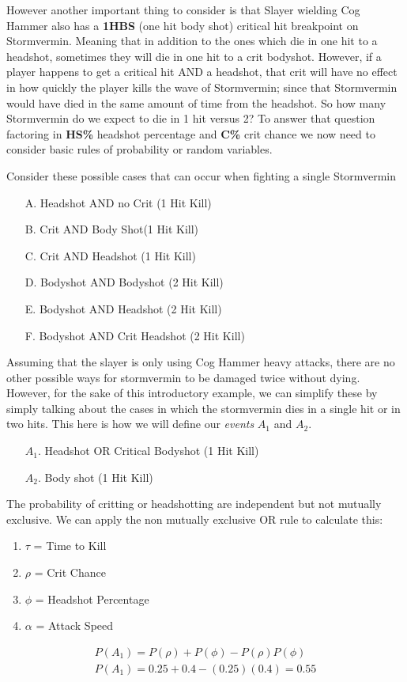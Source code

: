 \documentclass{article}
\begin{document}
However another important thing to consider is that Slayer wielding Cog Hammer also has a \textbf{1HBS} (one hit body shot) critical hit breakpoint on Stormvermin. Meaning that in addition to the ones which die in one hit to a headshot, sometimes they will die in one hit to a crit bodyshot. However, if a player happens to get a critical hit AND a headshot, that crit will have no effect in how quickly the player kills the wave of Stormvermin; since that Stormvermin would have died in the same amount of time from the headshot. So how many Stormvermin do we expect to die in 1 hit versus 2? To answer that question factoring in \textbf{HS\%} headshot percentage and \textbf{C\%} crit chance we now need to consider basic rules of probability or random variables.

Consider these possible cases that can occur when fighting a single Stormvermin
\begin{enumerate}
\item[A.] Headshot AND no Crit (1 Hit Kill)
\item[B.] Crit AND Body Shot(1 Hit Kill)
\item[C.] Crit AND Headshot (1 Hit Kill)
\item[D.] Bodyshot AND Bodyshot (2 Hit Kill)
\item[E.] Bodyshot AND Headshot (2 Hit Kill)
\item[F.] Bodyshot AND Crit Headshot (2 Hit Kill)
\end{enumerate}

Assuming that the slayer is only using Cog Hammer heavy attacks, there are no other possible ways for stormvermin to be damaged twice without dying. However, for the sake of this introductory example, we can simplify these by simply talking about the cases in which the stormvermin dies in a single hit or in two hits. This here is how we will define our \emph{events} $A_1$ and $A_2$.

\begin{enumerate}
\item[$A_1$.] Headshot OR Critical Bodyshot (1 Hit Kill)
\item[$A_2$.] Body shot (1 Hit Kill)
\end{enumerate}

The probability of critting or headshotting are independent but not mutually exclusive. We can apply the non mutually exclusive OR rule to calculate this:

\begin{enumerate}
\item $\tau$ = Time to Kill
\item $\rho$ = Crit Chance
\item $\phi$ = Headshot Percentage
\item $\alpha$ = Attack Speed
\end{enumerate}
\begin{align*}
P(A_1) = P(\rho) + P(\phi) - P(\rho)P(\phi) \\
P(A_1) = 0.25 + 0.4 - (0.25)(0.4) = 0.55
\end{align*}
\end{document}

